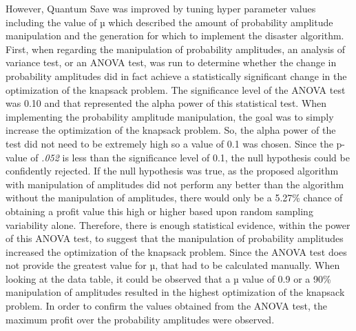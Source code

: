 \vspace{1mm}

However, Quantum Save was improved by tuning hyper parameter values including the value of µ which described the amount of probability amplitude manipulation and the generation for which to implement the disaster algorithm. First, when regarding the manipulation of probability amplitudes, an analysis of variance test, or an ANOVA test, was run to determine whether the change in probability amplitudes did in fact achieve a statistically significant change in the optimization of the knapsack problem. The significance level of the ANOVA test was 0.10 and that represented the alpha power of this statistical test. When implementing the probability amplitude manipulation, the goal was to simply increase the optimization of the knapsack problem. So, the alpha power of the test did not need to be extremely high so a value of 0.1 was chosen. Since the p-value of \textit{.052} is less than the significance level of 0.1, the null hypothesis could be confidently rejected. If the null hypothesis was true, as the proposed algorithm with manipulation of amplitudes did not perform any better than the algorithm without the manipulation of amplitudes, there would only be a 5.27\% chance of obtaining a profit value this high or higher based upon random sampling variability alone. Therefore, there is enough statistical evidence, within the power of this ANOVA test, to suggest that the manipulation of probability amplitudes increased the optimization of the knapsack problem. Since the ANOVA test does not provide the greatest value for µ, that had to be calculated manually. When looking at the data table, it could be observed that a µ value of 0.9 or a 90\% manipulation of amplitudes resulted in the highest optimization of the knapsack problem. In order to confirm the values obtained from the ANOVA test, the maximum profit over the probability amplitudes were observed. 

\vspace{1mm}

